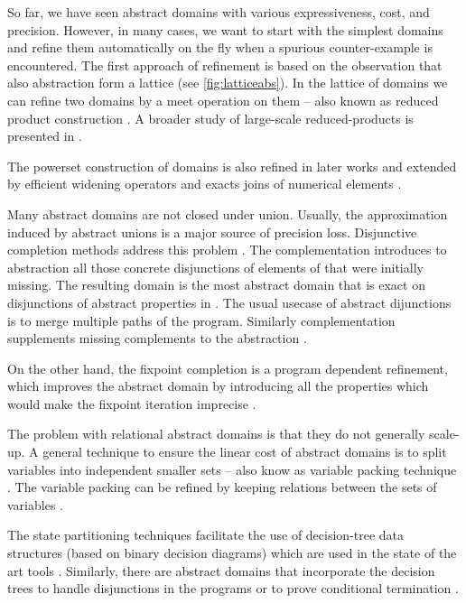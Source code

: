 So far, we have seen abstract domains with various expressiveness, cost, and
precision. However, in many cases, we want to start with the simplest domains
and refine them automatically on the fly when a spurious counter-example is
encountered. The first approach of refinement is based on the observation that
also abstraction form a lattice (see \autoref{fig:latticeabs}). In the lattice
of domains we can refine two domains by a meet operation on them -- also known
as reduced product construction \cite{Toubhans2013, Cousot2011b}. A broader
study of large-scale reduced-products is presented in \cite{Cousot2007}.

The powerset construction of domains \cite{Cousot1979} is also refined in later works
\cite{File1999} and extended by efficient widening operators \cite{Bagnara2004}
and exacts joins of numerical elements \cite{Bagnara2010}.

Many abstract domains are not closed under union. Usually, the approximation
induced by abstract unions is a major source of precision loss. Disjunctive
completion methods address this problem \cite{File1999}. The complementation
introduces to abstraction \domain{} all those concrete disjunctions of elements
of \domain{} that were initially missing. The resulting domain is the most
abstract domain that is exact on disjunctions of abstract properties in
\domain{}.  The usual usecase of abstract dijunctions is to merge multiple paths
of the program.  Similarly complementation supplements missing complements to the
abstraction \cite{Cortesi1995}.

On the other hand, the fixpoint completion is a program dependent refinement,
which improves the abstract domain by introducing all the properties which
would make the fixpoint iteration imprecise \cite{Giacobazzi2000,
Giacobazzi2001}.

The problem with relational abstract domains is that they do not generally
scale-up. A general technique to ensure the linear cost of abstract domains is
to split variables into independent smaller sets -- also know as variable
packing technique \cite{Mine2006}. The variable packing can be refined by
keeping relations between the sets of variables \cite{Bouzaziz2012}.

The state partitioning techniques \cite{Muchnick1981} facilitate the use of
decision-tree data structures (based on binary decision diagrams) which are
used in the state of the art tools \cite{Cousot2010, Bertrane2015}.
Similarly, there are abstract domains that incorporate the decision trees to
handle disjunctions in the programs \cite{Cousot2010a} or to prove conditional
termination \cite{Urban2010}.

